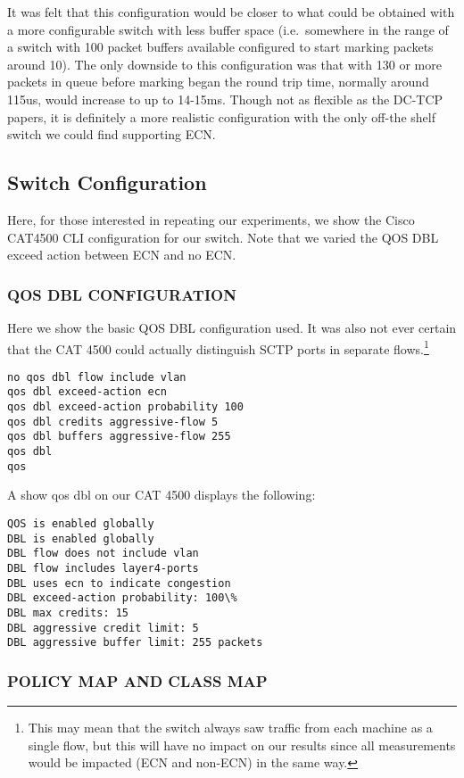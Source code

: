 \documentclass[12pt]{article}
\begin{document}
 It was felt that this configuration would be closer to what could be obtained with a more
 configurable switch with less buffer space (i.e.~somewhere in the range of a switch with
 100 packet buffers available configured to start marking packets around 10).  The only downside
 to this configuration was that with 130 or more packets in queue before marking began the
 round trip time, normally around 115us, would increase to up to 14-15ms.
 Though not as flexible as the DC-TCP papers, it is definitely a more realistic configuration with the only
 off-the shelf  switch we could find supporting ECN.

\subsection{Switch Configuration}

Here, for those interested in repeating our experiments, we show the Cisco CAT4500 CLI
configuration for our switch.  Note that we varied the QOS DBL exceed action between
ECN and no ECN.

\subsubsection{QOS DBL CONFIGURATION}
 
Here we show the basic QOS DBL configuration used. It was
also not ever certain that the CAT 4500 could actually distinguish SCTP ports in separate flows.\footnote{This
may mean that the switch always saw traffic from each machine as a single flow, but this will have no impact on
our results since all measurements would be impacted (ECN and non-ECN) in the same way.}
\begin{verbatim}
no qos dbl flow include vlan
qos dbl exceed-action ecn
qos dbl exceed-action probability 100
qos dbl credits aggressive-flow 5
qos dbl buffers aggressive-flow 255
qos dbl   
qos
\end{verbatim}
A show qos dbl on our CAT 4500 displays the following:
\begin{verbatim}
QOS is enabled globally
DBL is enabled globally
DBL flow does not include vlan
DBL flow includes layer4-ports
DBL uses ecn to indicate congestion
DBL exceed-action probability: 100\%
DBL max credits: 15
DBL aggressive credit limit: 5
DBL aggressive buffer limit: 255 packets
\end{verbatim}

\subsubsection {POLICY MAP AND CLASS MAP}
\end{document}
